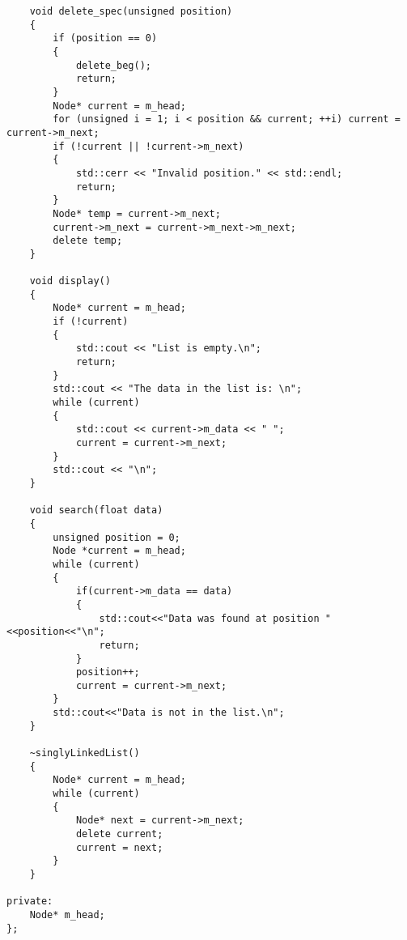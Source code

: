 \documentclass[12pt]{article}
\begin{document}
\begin{verbatim}
    void delete_spec(unsigned position)
    {
        if (position == 0)
        {
            delete_beg();
            return;
        }
        Node* current = m_head;
        for (unsigned i = 1; i < position && current; ++i) current = current->m_next;
        if (!current || !current->m_next)
        {
            std::cerr << "Invalid position." << std::endl;
            return;
        }
        Node* temp = current->m_next;
        current->m_next = current->m_next->m_next;
        delete temp;
    }

    void display()
    {
        Node* current = m_head;
        if (!current)
        {
            std::cout << "List is empty.\n";
            return;
        }
        std::cout << "The data in the list is: \n";
        while (current)
        {
            std::cout << current->m_data << " ";
            current = current->m_next;
        }
        std::cout << "\n";
    }

    void search(float data)
    {
        unsigned position = 0;
        Node *current = m_head;
        while (current)
        {
            if(current->m_data == data)
            {
                std::cout<<"Data was found at position "<<position<<"\n";
                return;
            }
            position++;
            current = current->m_next;
        }
        std::cout<<"Data is not in the list.\n";
    }

    ~singlyLinkedList()
    {
        Node* current = m_head;
        while (current)
        {
            Node* next = current->m_next;
            delete current;
            current = next;
        }
    }

private:
    Node* m_head;
};
	\end{verbatim}
	\newpage
\end{document}
